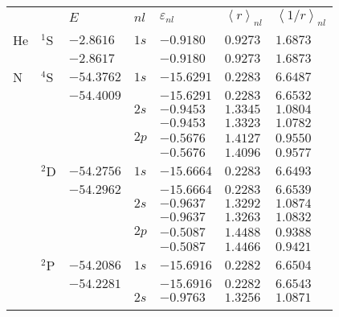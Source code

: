 \begin{table}
\begin{center}
\begin{tabular}{
>{\centering\arraybackslash}p{}
>{\centering\arraybackslash}p{}
>{\centering\arraybackslash}p{}
>{\centering\arraybackslash}p{}
>{\centering\arraybackslash}p{}
>{\centering\arraybackslash}p{}
>{\centering\arraybackslash}p{}}
\rowcolor{mydarkgray} 
   & & $E$ & $nl$ & $\varepsilon_{nl}$ & $\left<r\right>_{nl}$ & $\left<1/r\right>_{nl}$ \\
He & $^1$S & $-2.8616$   & $1s$ & $-0.9180$  & $0.9273$ & $1.6873$ \\\rowcolor{mygray} 
   &       & $-2.8617$   &      & $-0.9180$  & $0.9273$ & $1.6873$ \\
N  & $^4$S & $-54.3762$  & $1s$ & $-15.6291$ & $0.2283$ & $6.6487$ \\\rowcolor{mygray} 
   &       & $-54.4009$  &      & $-15.6291$ & $0.2283$ & $6.6532$ \\
   &       &             & $2s$ & $-0.9453$  & $1.3345$ & $1.0804$ \\\rowcolor{mygray} 
   &       &             &      & $-0.9453$  & $1.3323$ & $1.0782$ \\
   &       &             & $2p$ & $-0.5676$  & $1.4127$ & $0.9550$ \\\rowcolor{mygray} 
   &       &             &      & $-0.5676$  & $1.4096$ & $0.9577$ \\
   & $^2$D & $-54.2756$  & $1s$ & $-15.6664$ & $0.2283$ & $6.6493$ \\\rowcolor{mygray} 
   &       & $-54.2962$  &      & $-15.6664$ & $0.2283$ & $6.6539$ \\
   &       &             & $2s$ & $-0.9637$  & $1.3292$ & $1.0874$ \\\rowcolor{mygray} 
   &       &             &      & $-0.9637$  & $1.3263$ & $1.0832$ \\
   &       &             & $2p$ & $-0.5087$  & $1.4488$ & $0.9388$ \\\rowcolor{mygray} 
   &       &             &      & $-0.5087$  & $1.4466$ & $0.9421$ \\
   & $^2$P & $-54.2086$  & $1s$ & $-15.6916$ & $0.2282$ & $6.6504$ \\\rowcolor{mygray} 
   &       & $-54.2281$  &      & $-15.6916$ & $0.2282$ & $6.6543$ \\
   &       &             & $2s$ & $-0.9763$  & $1.3256$ & $1.0871$ \\\rowcolor{mygray} 

\end{tabular}
\end{center}
\end{table}
